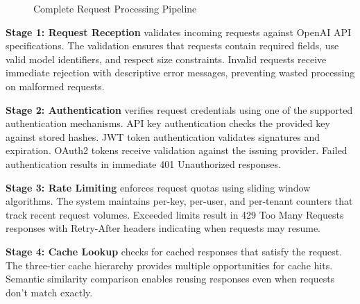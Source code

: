 \documentclass[12pt,a4paper,twoside]{report}
\begin{document}
\begin{figure}[p]
\caption{Complete Request Processing Pipeline}
\label{fig:request-pipeline}
\end{figure}

\clearpage

\textbf{Stage 1: Request Reception} validates incoming requests against OpenAI API specifications. The validation ensures that requests contain required fields, use valid model identifiers, and respect size constraints. Invalid requests receive immediate rejection with descriptive error messages, preventing wasted processing on malformed requests.

\textbf{Stage 2: Authentication} verifies request credentials using one of the supported authentication mechanisms. API key authentication checks the provided key against stored hashes. JWT token authentication validates signatures and expiration. OAuth2 tokens receive validation against the issuing provider. Failed authentication results in immediate 401 Unauthorized responses.

\textbf{Stage 3: Rate Limiting} enforces request quotas using sliding window algorithms. The system maintains per-key, per-user, and per-tenant counters that track recent request volumes. Exceeded limits result in 429 Too Many Requests responses with Retry-After headers indicating when requests may resume.

\textbf{Stage 4: Cache Lookup} checks for cached responses that satisfy the request. The three-tier cache hierarchy provides multiple opportunities for cache hits. Semantic similarity comparison enables reusing responses even when requests don't match exactly.
\end{document}
